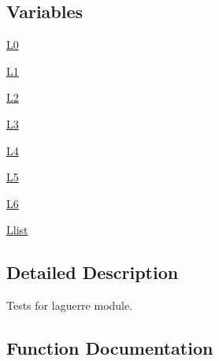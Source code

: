 \subsection*{Variables}
\begin{DoxyCompactItemize}
\item 
\hyperlink{namespacenumpy_1_1polynomial_1_1tests_1_1test__laguerre_a4797dfb918a818d6a907a582f90e04d7}{L0}
\item 
\hyperlink{namespacenumpy_1_1polynomial_1_1tests_1_1test__laguerre_a0578a6a333a38cf36d68a44f45d9907d}{L1}
\item 
\hyperlink{namespacenumpy_1_1polynomial_1_1tests_1_1test__laguerre_a8df327fb97d6f931fe5497bc84bbec9b}{L2}
\item 
\hyperlink{namespacenumpy_1_1polynomial_1_1tests_1_1test__laguerre_a10dbda09004c9aa5739b0ab8a35a781f}{L3}
\item 
\hyperlink{namespacenumpy_1_1polynomial_1_1tests_1_1test__laguerre_ae4591e5780f5ee6a97e4d0e4c3f7267b}{L4}
\item 
\hyperlink{namespacenumpy_1_1polynomial_1_1tests_1_1test__laguerre_ab69faf6ec349ae24039759e7bbe63353}{L5}
\item 
\hyperlink{namespacenumpy_1_1polynomial_1_1tests_1_1test__laguerre_a8e07178b764895f8873daeb2baa2f83d}{L6}
\item 
\hyperlink{namespacenumpy_1_1polynomial_1_1tests_1_1test__laguerre_aeff30c6f6dba98f1f5d4c8223257ca4c}{Llist}
\end{DoxyCompactItemize}


\subsection{Detailed Description}
\begin{DoxyVerb}Tests for laguerre module.\end{DoxyVerb}
 

\subsection{Function Documentation}
\mbox{\label{namespacenumpy_1_1polynomial_1_1tests_1_1test__laguerre_a828c70e70d8f81e6fb4583dfa0fc4b66}} 
